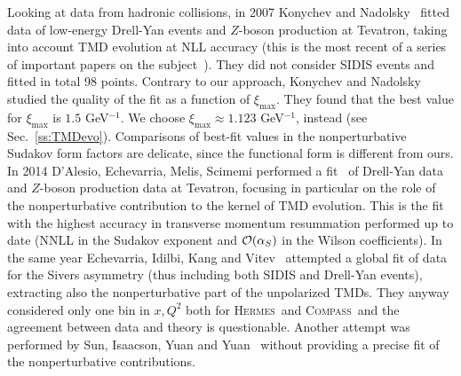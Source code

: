 \documentclass[aps,preprintnumbers,showpacs,nofootinbib,superscriptaddress,floatfix]{revtex4}
\newcommand{\hermes}{\textsc{Hermes}}
\newcommand{\compass}{\textsc{Compass}}
\newcommand{\bb}{\xi}
\begin{document}
Looking at data from hadronic collisions, in 2007 Konychev and
Nadolsky~\cite{Konychev:2005iy} fitted data of low-energy Drell-Yan events and
$Z$-boson production at Tevatron, taking into account TMD evolution at NLL
accuracy (this is the most recent of a series of important papers on
the subject~\cite{Ladinsky:1993zn,Landry:1999an,Landry:2002ix}). They did not consider SIDIS events and fitted in total 98
points. Contrary to our approach, Konychev and Nadolsky studied the quality of the fit as a
function of $\bb_{\text{max}}$. They found that the best value for
$\bb_{\text{max}}$ is $1.5$ GeV$^{-1}$. We choose $\bb_{\text{max}}\approx 1.123$ GeV$^{-1}$, instead (see Sec.~\ref{ss:TMDevo}). Comparisons of best-fit values in the nonperturbative Sudakov form factors are delicate, since the functional form is different from ours.
In 2014 D'Alesio, Echevarria, Melis, Scimemi performed a fit~\cite{DAlesio:2014mrz} of Drell-Yan data and $Z$-boson production data at Tevatron, focusing in particular on the role of the nonperturbative contribution to the kernel of TMD evolution. This is the fit with the highest accuracy in transverse momentum resummation performed up to date (NNLL in the Sudakov exponent and ${\cal O}(\alpha_S)$ in the Wilson coefficients). 
In the same year Echevarria, Idilbi, Kang and Vitev~\cite{Echevarria:2014xaa} attempted a global fit of data for the Sivers asymmetry (thus including both SIDIS and Drell-Yan events), extracting also the nonperturbative part of the unpolarized TMDs. They anyway considered only one bin in $x, Q^2$ both for \hermes\ and \compass\ and the agreement between data and theory is questionable. 
Another attempt was performed by Sun, Isaacson, Yuan and Yuan~\cite{Su:2014wpa} without providing a precise fit of the nonperturbative contributions.
\end{document}
